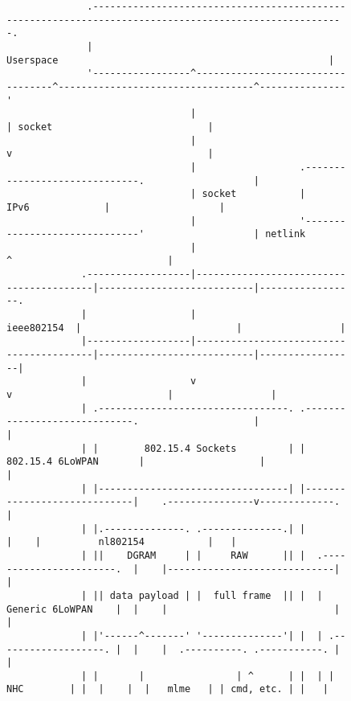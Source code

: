 \begin{figure}
\centering
{\fontsize{5.20}{4}\selectfont 
\begin{verbatim}
              .-------------------------------------------------------------------------------------------------------.
              |                                               Userspace                                               |
              '-----------------^----------------------------------^----------------------------------^---------------'
                                |                                  | socket                           |
                                |                                  v                                  |
                                |                  .------------------------------.                   |
                                | socket           |             IPv6             |                   |
                                |                  '------------------------------'                   | netlink
                                |                                         ^                           |
             .------------------|-----------------------------------------|---------------------------|-----------------.
             |                  |                             ieee802154  |                           |                 |
             |------------------|-----------------------------------------|---------------------------|-----------------|
             |                  v                                         v                           |                 |
             | .---------------------------------. .-----------------------------.                    |                 |
             | |        802.15.4 Sockets         | |      802.15.4 6LoWPAN       |                    |                 |
             | |---------------------------------| |-----------------------------|    .---------------v-------------.   |
             | |.--------------. .--------------.| |                             |    |          nl802154           |   |
             | ||    DGRAM     | |     RAW      || |  .-----------------------.  |    |-----------------------------|   |
             | || data payload | |  full frame  || |  |    Generic 6LoWPAN    |  |    |                             |   |
             | |'------^-------' '--------------'| |  | .-------------------. |  |    |  .----------. .-----------. |   |
             | |       |                | ^      | |  | |        NHC        | |  |    |  |   mlme   | | cmd, etc. | |   |

\end{verbatim}}
\end{figure}
